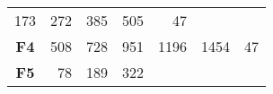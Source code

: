 \documentclass[12pt,a4paper]{article}
\begin{document}
\begin{longtable}[c]{@{}crrrrrr@{}}
\begin{minipage}[t]{0.08\columnwidth}\raggedleft\strut
173
\strut\end{minipage} &
\begin{minipage}[t]{0.09\columnwidth}\raggedleft\strut
272
\strut\end{minipage} &
\begin{minipage}[t]{0.10\columnwidth}\raggedleft\strut
385
\strut\end{minipage} &
\begin{minipage}[t]{0.11\columnwidth}\raggedleft\strut
505
\strut\end{minipage} &
\begin{minipage}[t]{0.07\columnwidth}\raggedleft\strut
47
\strut\end{minipage}\tabularnewline
\begin{minipage}[t]{0.11\columnwidth}\centering\strut
\textbf{F4}
\strut\end{minipage} &
\begin{minipage}[t]{0.08\columnwidth}\raggedleft\strut
508
\strut\end{minipage} &
\begin{minipage}[t]{0.08\columnwidth}\raggedleft\strut
728
\strut\end{minipage} &
\begin{minipage}[t]{0.09\columnwidth}\raggedleft\strut
951
\strut\end{minipage} &
\begin{minipage}[t]{0.10\columnwidth}\raggedleft\strut
1196
\strut\end{minipage} &
\begin{minipage}[t]{0.11\columnwidth}\raggedleft\strut
1454
\strut\end{minipage} &
\begin{minipage}[t]{0.07\columnwidth}\raggedleft\strut
47
\strut\end{minipage}\tabularnewline
\begin{minipage}[t]{0.11\columnwidth}\centering\strut
\textbf{F5}
\strut\end{minipage} &
\begin{minipage}[t]{0.08\columnwidth}\raggedleft\strut
78
\strut\end{minipage} &
\begin{minipage}[t]{0.08\columnwidth}\raggedleft\strut
189
\strut\end{minipage} &
\begin{minipage}[t]{0.09\columnwidth}\raggedleft\strut
322
\strut\end{minipage} &

\end{longtable}
\end{document}
